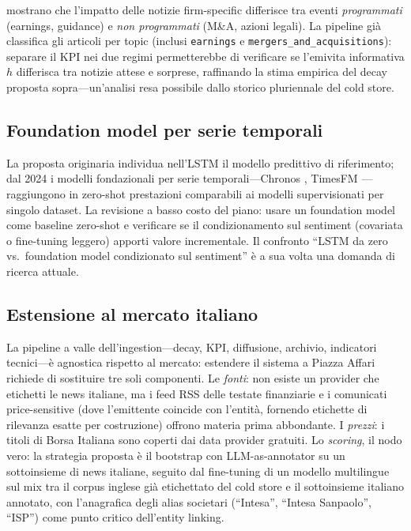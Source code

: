 \textcite{boudoukh2019information} mostrano che l'impatto delle notizie firm-specific differisce tra eventi \emph{programmati} (earnings, guidance) e \emph{non programmati} (M\&A, azioni legali).
La pipeline già classifica gli articoli per topic (inclusi \texttt{earnings} e \texttt{mergers\_and\_acquisitions}): separare il KPI nei due regimi permetterebbe di verificare se l'emivita informativa $h$ differisca tra notizie attese e sorprese, raffinando la stima empirica del decay proposta sopra---un'analisi resa possibile dallo storico pluriennale del cold store.

\subsection{Foundation model per serie temporali}

La proposta originaria individua nell'LSTM il modello predittivo di riferimento; dal 2024 i modelli fondazionali per serie temporali---Chronos \parencite{ansari2024chronos}, TimesFM \parencite{das2024timesfm}---raggiungono in zero-shot prestazioni comparabili ai modelli supervisionati per singolo dataset.
La revisione a basso costo del piano: usare un foundation model come baseline zero-shot e verificare se il condizionamento sul sentiment (covariata o fine-tuning leggero) apporti valore incrementale.
Il confronto ``LSTM da zero vs.\ foundation model condizionato sul sentiment'' è a sua volta una domanda di ricerca attuale.

\subsection{Estensione al mercato italiano}
\label{sec:mercato-italiano}

La pipeline a valle dell'ingestion---decay, KPI, diffusione, archivio, indicatori tecnici---è agnostica rispetto al mercato: estendere il sistema a Piazza Affari richiede di sostituire tre soli componenti.
Le \emph{fonti}: non esiste un provider che etichetti le news italiane, ma i feed RSS delle testate finanziarie e i comunicati price-sensitive (dove l'emittente coincide con l'entità, fornendo etichette di rilevanza esatte per costruzione) offrono materia prima abbondante.
I \emph{prezzi}: i titoli di Borsa Italiana sono coperti dai data provider gratuiti.
Lo \emph{scoring}, il nodo vero: la strategia proposta è il bootstrap con LLM-as-annotator su un sottoinsieme di news italiane, seguito dal fine-tuning di un modello multilingue sul mix tra il corpus inglese già etichettato del cold store e il sottoinsieme italiano annotato, con l'anagrafica degli alias societari (``Intesa'', ``Intesa Sanpaolo'', ``ISP'') come punto critico dell'entity linking.

